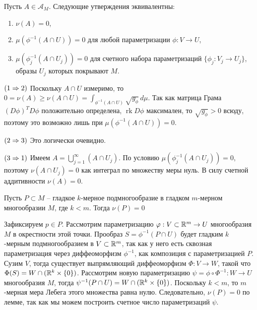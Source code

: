 \begin{lemma}
	Пусть $A \in \mathcal{A}_M$. Следующие утверждения эквивалентны: 
	\begin{enumerate}[itemsep = 0pt, topsep = 5pt]
		\item $\nu(A) = 0$, 
		\item $\mu(\phi^{-1}(A \cap U)) = 0$ для любой параметризации $\phi : V \to U$, 
		\item $\mu(\phi_j^{-1}(A \cap U_j)) = 0$ для счетного набора параметризаций $\{\phi_j : V_j \to U_j\}$, образы $U_j$ которых покрывают $M$. 
	\end{enumerate}
\end{lemma}

 \begin{myproof}
	$(1 \Rightarrow 2)$ Поскольку $A \cap U$ измеримо, то
	$0 = \nu(A) \geq \nu(A \cap U) = \int_{\phi^{-1}(A \cap U)} \sqrt{g_{\phi}} \, d \mu$. 
	Так как матрица Грама $(D \phi)^T D \phi$ положительно определена, $\operatorname{rk} D \phi$ максимален, то $\sqrt{g_{\phi}} > 0$ всюду, поэтому это возможно лишь при $\mu(\phi^{-1}(A \cap U)) = 0$.

	\vspace{5pt}
	$(2 \Rightarrow 3)$ Это логически очевидно.

	\vspace{5pt}
	$(3 \Rightarrow 1)$ Имеем $A = \bigcup_{j=1}^{\infty} (A \cap U_j)$. 
	По условию $\mu(\phi^{-1}_j(A \cap U_j)) = 0$, поэтому $\nu(A \cap U_j) = 0$ как интеграл по множеству меры нуль.
	В силу счетной аддитивности $\nu(A) = 0$.
 \end{myproof}


 \begin{corollary}
	Пусть $P \subset M$ -- гладкое $k$-мерное подмногообразие в гладком $m$-мерном многообразии $M$, где $k < m$. 
	Тогда $\nu(P) = 0$   
 \end{corollary}

 \begin{myproof}
	Зафиксируем $p \in P$. Рассмотрим параметризацию $\varphi : V \subset \mathbb{R}^m \to U$ многообразия $M$ в окрестности этой точки.
	Прообраз $S = \phi^{-1}(P \cap U)$ будет гладким $k$-мерным подмногообразием в $V \subset \mathbb{R}^m$, так как у него есть сквозная параметризация через диффеоморфизм $\phi^{-1}$, как композиция с параметризацией $P$.
	Сузим $V$, тогда существует выпрямляющий диффеоморфизм $\Phi : V \to W$, такой что $\Phi(S) = W \cap (\mathbb{R}^k \times \{0\})$. 
	Рассмотрим новую параметризацию $\psi = \phi \circ \Phi^{-1} : W \to U$ многообразия $M$, тогда $\psi^{-1}(P \cap U) =  W \cap (\mathbb{R}^k \times \{0\})$. 
	Поскольку $k < m$, то $m$-мерная мера Лебега этого множества равна нулю. 
	Следовательно, $\nu(P) = 0$ по лемме, так как мы можем построить счетное число параметризаций $\psi$.
\end{myproof}

